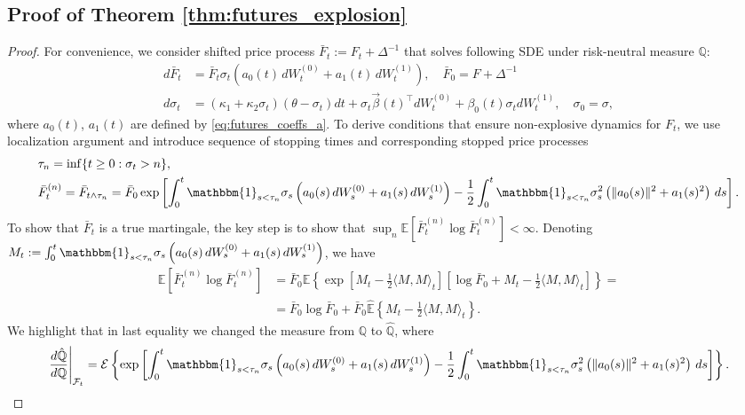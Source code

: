 \documentclass[pdftex,11pt,a4paper] {article}
\begin{document}
\subsection{Proof of Theorem \ref{thm:futures_explosion}}\label{app:futures_explosion}
\begin{proof}
For convenience, we consider shifted price process $\bar F_t:=F_t+\Delta^{-1}$ that solves following SDE under risk-neutral measure $\mathbb{Q}$:
\begin{equation*}
\begin{split}
d\bar F_t&=\bar F_t\sigma_t\left(a_0(t)\,dW_t^{(0)}+a_1(t)\,dW_t^{(1)}\right), \quad \bar F_0=F+\Delta^{-1}\\
d\sigma_t&=\left(\kappa_{1}+\kappa_{2}\sigma_t\right)(\theta-\sigma_t)dt + \sigma_t\vec{\beta}(t)^\top dW^{(0)}_t+\beta_0(t)\sigma_tdW^{(1)}_t,\quad \sigma_0=\sigma,
\end{split}
\end{equation*}
where $a_0(t)$, $a_1(t)$ are defined by \eqref{eq:futures_coeffs_a}.
To derive conditions that ensure non-explosive dynamics for $F_t$, we use localization argument and introduce sequence of stopping times and corresponding stopped price processes 
\begin{equation*}
\begin{split}
&\tau_n=\inf\{t\ge 0: \sigma_t>n\},\\
&\bar F_t^{(n)}=\bar F_{t\wedge\tau_n}=\bar F_0\exp\left[\int_0^t\mathbbm{1}_{s<\tau_n}\sigma_s\left(a_0(s)\,dW_s^{(0)}+a_1(s)\,dW_s^{(1)}\right)-\frac{1}{2}\int_0^t\mathbbm{1}_{s<\tau_n}\sigma_s^2\left(\|a_0(s)\|^2+a_1(s)^2\right)\,ds\right].
\end{split}
\end{equation*}
To show that $\bar F_t$ is a  true martingale, the key step is to show that $\sup_n\mathbb{E}\left[\bar F_t^{(n)}\log \bar F_t^{(n)}\right]<\infty$. Denoting $M_t:=\int_0^t\mathbbm{1}_{s<\tau_n}\sigma_s\left(a_0(s)\,dW_s^{(0)}+a_1(s)\,dW_s^{(1)}\right)$, we have
\begin{equation}\label{eq:fut_expl1}
\begin{split}
\mathbb{E}\left[\bar F_t^{(n)}\log \bar F_t^{(n)}\right]&=
\bar F_0\mathbb{E}\left\{\exp\left[M_t-\frac{1}{2}\langle M,M\rangle_t\right]\left[\log \bar F_0+M_t-\frac{1}{2}\langle M,M\rangle_t\right]\right\}=\\
&=\bar F_0\log \bar F_0 + \bar F_0\mathbb{\hat E}\left\{M_t-\frac{1}{2}\langle M,M\rangle_t\right\}.
\end{split}
\end{equation}
We highlight that in last equality we changed the measure from $\mathbb{Q}$ to $\mathbb{\hat Q}$, where
\begin{equation*}
\left.\frac{d\mathbb{\hat Q}}{d\mathbb{Q}}\right|_{\mathcal{F}_t}=
\mathcal{E}\left\{\exp\left[\int_0^t\mathbbm{1}_{s<\tau_n}\sigma_s\left(a_0(s)\,dW_s^{(0)}+a_1(s)\,dW_s^{(1)}\right)-\frac{1}{2}\int_0^t\mathbbm{1}_{s<\tau_n}\sigma_s^2\left(\|a_0(s)\|^2+a_1(s)^2\right)\,ds\right]\right\}.
\end{equation*}


\end{proof}
\end{document}
